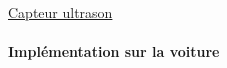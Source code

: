 \documentclass[french, handout]{beamer}
\begin{document}
            \begin{frame}{\hyperlink{pres_capteurs}{Capteur ultrason}}
            \label{details_ultrason}
            \framesubtitle{\quad Implémentation sur la voiture}
                \vspace{-0.1cm}
                \begin{center}
                    \hspace*{-0.5em}
                \end{center}
            \end{frame}
\end{document}
